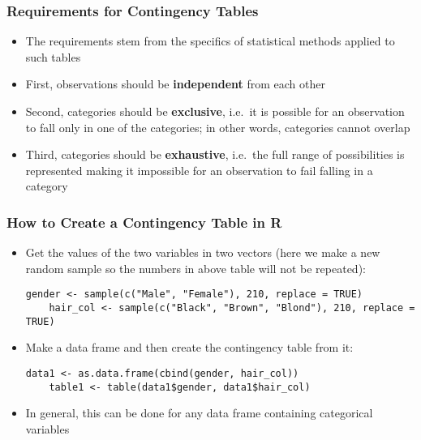 \documentclass[10pt]{beamer}
\theoremstyle{definition}
\begin{document}
\begin{frame}[fragile]
\frametitle{Requirements for Contingency Tables}
\begin{itemize}
	\item The requirements stem from the specifics of statistical methods applied to such tables
	
	\item First, observations should be \textbf{independent} from each other
	
	\item Second, categories should be \textbf{exclusive}, i.e.~it is possible for an observation to fall only in one of the categories; in other words, categories cannot overlap
	
	\item Third, categories should be \textbf{exhaustive}, i.e.~the full range of possibilities is represented making it impossible for an observation to fail falling in a category
\end{itemize}
\end{frame}

\begin{frame}[fragile]
\frametitle{How to Create a Contingency Table in R}
\begin{itemize}
	\item Get the values of the two variables in two vectors (here we make a new random sample so the numbers in above table will not be repeated):
	\begin{lstlisting}[style = rstyle, breaklines]
	gender <- sample(c("Male", "Female"), 210, replace = TRUE)
	hair_col <- sample(c("Black", "Brown", "Blond"), 210, replace = TRUE)
	\end{lstlisting}
	
	\item Make a data frame and then create the contingency table from it:
	\begin{lstlisting}[style = rstyle, breaklines]
	data1 <- as.data.frame(cbind(gender, hair_col))
	table1 <- table(data1$gender, data1$hair_col)
	\end{lstlisting}
	
	\item In general, this can be done for any data frame containing categorical variables
\end{itemize}
\end{frame}
\end{document}
